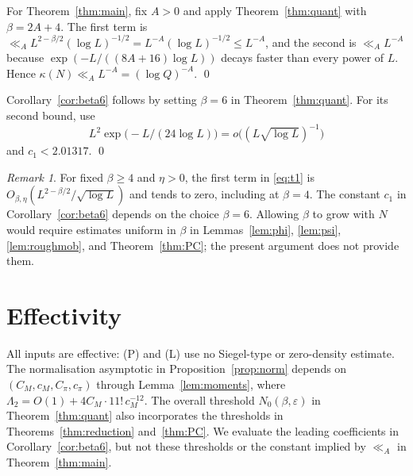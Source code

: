 \documentclass[11pt,a4paper]{article}
\theoremstyle{plain}
\theoremstyle{definition}
\theoremstyle{remark}
\newtheorem{remark}[theorem]{Remark}
\newcommand{\eps}{\varepsilon}
\begin{document}
For Theorem~\ref{thm:main}, fix $A>0$ and apply Theorem~\ref{thm:quant} with $\beta=2A+4$. The first term
is $\ll_{A}L^{2-\beta/2}(\log L)^{-1/2}=L^{-A}(\log L)^{-1/2}\le L^{-A}$, and the second is $\ll_{A}L^{-A}$
because $\exp(-L/((8A+16)\log L))$ decays faster than every power of $L$. Hence
$\kappa(N)\ll_{A}L^{-A}=(\log Q)^{-A}$. \qed

Corollary~\ref{cor:beta6} follows by setting $\beta=6$ in Theorem~\ref{thm:quant}.
For its second bound, use
\[
  L^2\exp\bigl(-L/(24\log L)\bigr)
  =o\bigl((L\sqrt{\log L})^{-1}\bigr)
\]
and $c_1<2.01317$. \qed

\begin{remark}\label{rem:fixedbeta}
For fixed $\beta\ge4$ and $\eta>0$, the first term in \eqref{eq:t1} is
$O_{\beta,\eta}(L^{2-\beta/2}/\sqrt{\log L})$ and tends to zero, including at $\beta=4$.
The constant $c_1$ in Corollary~\ref{cor:beta6} depends on the choice $\beta=6$. Allowing $\beta$
to grow with $N$ would require estimates uniform in $\beta$ in Lemmas~\ref{lem:phi},
\ref{lem:psi}, \ref{lem:roughmob}, and Theorem~\ref{thm:PC}; the present argument does not provide them.
\end{remark}

\section{Effectivity}\label{sec:effectivity}
All inputs are effective: (P) and (L) use no Siegel-type or zero-density estimate. The normalisation asymptotic in
Proposition~\ref{prop:norm} depends on $(C_M,c_M,C_\pi,c_\pi)$ through Lemma~\ref{lem:moments}, where
$\Lambda_2=O(1)+4C_M\cdot11!\,c_M^{-12}$. The overall threshold $N_0(\beta,\eps)$ in
Theorem~\ref{thm:quant} also incorporates the thresholds in Theorems~\ref{thm:reduction}
and~\ref{thm:PC}. We evaluate the leading coefficients in Corollary~\ref{cor:beta6}, but not these
thresholds or the constant implied by $\ll_A$ in Theorem~\ref{thm:main}.
\end{document}
